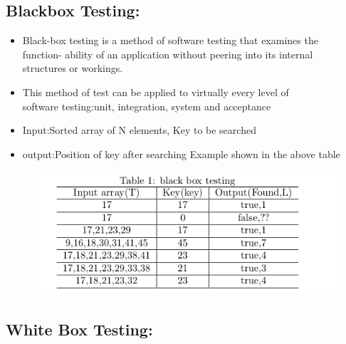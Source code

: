 \documentclass{article}
\begin{document}
	\subsection{Blackbox Testing:}
	\begin{itemize}
		\item Black-box testing is a method of software testing that examines the\\ function- ability of an application without peering into its internal\\ structures or workings.\\
		\item This method of test can be applied to virtually every level of\\ software testing:unit, integration, system and acceptance\\
		\item Input:Sorted array of N elements, Key to be searched\\
		\item output:Position of key after searching
		Example shown in the above table\\
	\end{itemize}
	
	\begin{figure}[h!]
		\centering
		\includegraphics[scale=0.7]{table.png}
	\end{figure}
	
	\subsection{White Box Testing:}
	
\end{document}

